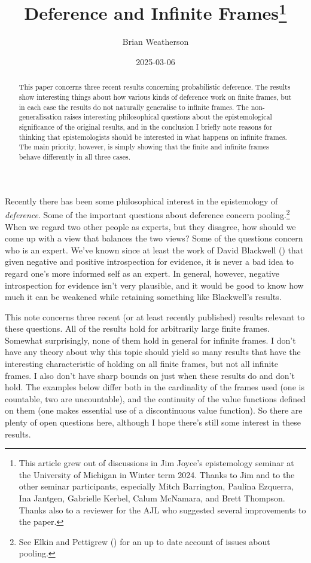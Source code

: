 \documentclass[
  12pt,
  letterpaper,
  DIV=11,
  numbers=noendperiod]{scrartcl}
\title{Deference and Infinite Frames\thanks{This article grew out of
discussions in Jim Joyce's epistemology seminar at the University of
Michigan in Winter term 2024. Thanks to Jim and to the other seminar
participants, especially Mitch Barrington, Paulina Ezquerra, Ina
Jantgen, Gabrielle Kerbel, Calum McNamara, and Brett Thompson. Thanks
also to a reviewer for the AJL who suggested several improvements to the
paper.}}
\author{Brian Weatherson}
\date{2025-03-06}
\begin{document}
\maketitle
\begin{abstract}
This paper concerns three recent results concerning probabilistic
deference. The results show interesting things about how various kinds
of deference work on finite frames, but in each case the results do not
naturally generalise to infinite frames. The non-generalisation raises
interesting philosophical questions about the epistemological
significance of the original results, and in the conclusion I briefly
note reasons for thinking that epistemologists should be interested in
what happens on infinite frames. The main priority, however, is simply
showing that the finite and infinite frames behave differently in all
three cases.
\end{abstract}


Recently there has been some philosophical interest in the epistemology
of \emph{deference}. Some of the important questions about deference
concern pooling.\footnote{See Elkin and Pettigrew
  () for an up to date account of
  issues about pooling.} When we regard two other people as experts, but
they disagree, how should we come up with a view that balances the two
views? Some of the questions concern who is an expert. We've known since
at least the work of David Blackwell
() that given negative and positive
introspection for evidence, it is never a bad idea to regard one's more
informed self as an expert. In general, however, negative introspection
for evidence isn't very plausible, and it would be good to know how much
it can be weakened while retaining something like Blackwell's results.

This note concerns three recent (or at least recently published) results
relevant to these questions. All of the results hold for arbitrarily
large finite frames. Somewhat surprisingly, none of them hold in general
for infinite frames. I don't have any theory about why this topic should
yield so many results that have the interesting characteristic of
holding on all finite frames, but not all infinite frames. I also don't
have sharp bounds on just when these results do and don't hold. The
examples below differ both in the cardinality of the frames used (one is
countable, two are uncountable), and the continuity of the value
functions defined on them (one makes essential use of a discontinuous
value function). So there are plenty of open questions here, although I
hope there's still some interest in these results.
\end{document}
